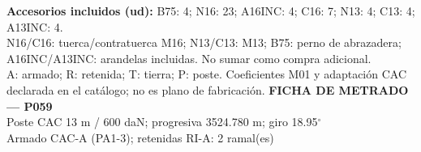 \begingroup\scriptsize
\textbf{Accesorios incluidos (ud):} B75: 4; N16: 23; A16INC: 4; C16: 7; N13: 4; C13: 4; A13INC: 4.\\
N16/C16: tuerca/contratuerca M16; N13/C13: M13; B75: perno de abrazadera; A16INC/A13INC: arandelas incluidas. No sumar como compra adicional.\\
A: armado; R: retenida; T: tierra; P: poste. Coeficientes M01 y adaptación CAC declarada en el catálogo; no es plano de fabricación.
\endgroup\endgroup
\clearpage{}
\begingroup\small\setlength{\parskip}{3pt}\renewcommand{\arraystretch}{1.05}
\textbf{\large FICHA DE METRADO — P059}\\[4pt]
Poste CAC 13 m / 600 daN; progresiva 3524.780 m; giro 18.95\ensuremath{^\circ}\\
Armado CAC-A (PA1-3); retenidas RI-A: 2 ramal(es)\\
\begingroup\scriptsize
